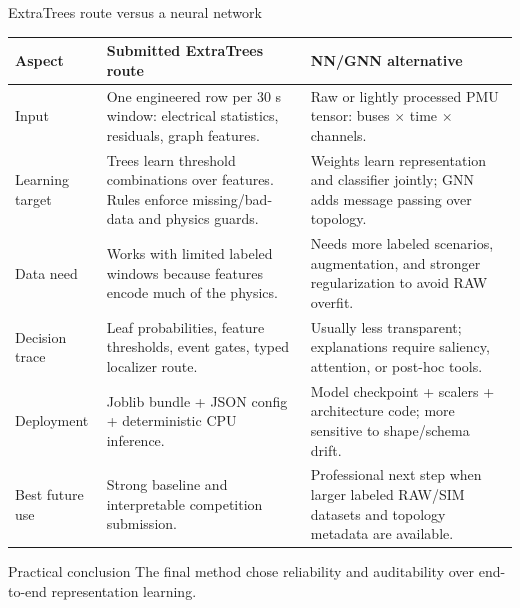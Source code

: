 ﻿\documentclass[10pt,aspectratio=169]{beamer}
\begin{document}
\begin{frame}{ExtraTrees route versus a neural network}
\scriptsize
\centering
\begin{tabular}{p{}p{}p{}}
\toprule
\textbf{Aspect} & \textbf{Submitted ExtraTrees route} & \textbf{NN/GNN alternative}\\
\midrule
Input &
One engineered row per 30 s window: electrical statistics, residuals, graph features. &
Raw or lightly processed PMU tensor: buses $\times$ time $\times$ channels.\\
Learning target &
Trees learn threshold combinations over features. Rules enforce missing/bad-data and physics guards. &
Weights learn representation and classifier jointly; GNN adds message passing over topology.\\
Data need &
Works with limited labeled windows because features encode much of the physics. &
Needs more labeled scenarios, augmentation, and stronger regularization to avoid RAW overfit.\\
Decision trace &
Leaf probabilities, feature thresholds, event gates, typed localizer route. &
Usually less transparent; explanations require saliency, attention, or post-hoc tools.\\
Deployment &
Joblib bundle + JSON config + deterministic CPU inference. &
Model checkpoint + scalers + architecture code; more sensitive to shape/schema drift.\\
Best future use &
Strong baseline and interpretable competition submission. &
Professional next step when larger labeled RAW/SIM datasets and topology metadata are available.\\
\bottomrule
\end{tabular}
\vspace{2mm}
\begin{alertblock}{Practical conclusion}
The final method chose reliability and auditability over end-to-end representation learning.
\end{alertblock}
\end{frame}
\end{document}
